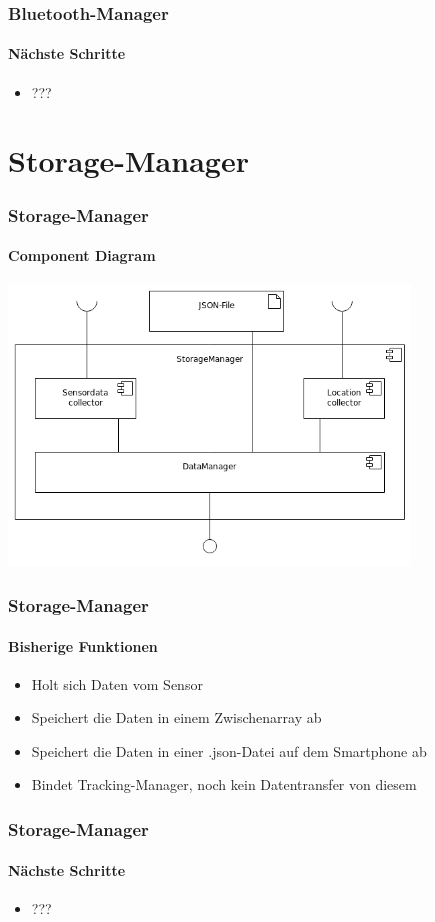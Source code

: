 \documentclass{beamer}
\begin{document}
\begin{frame}
\frametitle{Bluetooth-Manager}
\framesubtitle{N\"achste Schritte}
\begin{itemize}
  \item ???
\end{itemize}
\end{frame}


\section{Storage-Manager}

\begin{frame}
\frametitle{Storage-Manager}
\framesubtitle{Component Diagram}
\hspace{1cm} \includegraphics[width=0.8\textwidth]{../doc/SDD/pics/StorageMgr_Composition.png}
\end{frame}

\begin{frame}
\frametitle{Storage-Manager}
\framesubtitle{Bisherige Funktionen}
\begin{itemize}
  \item Holt sich Daten vom Sensor
  \item Speichert die Daten in einem Zwischenarray ab
  \item Speichert die Daten in einer .json-Datei auf dem Smartphone ab
  \item Bindet Tracking-Manager, noch kein Datentransfer von diesem
\end{itemize}
\end{frame}

\begin{frame}
\frametitle{Storage-Manager}
\framesubtitle{N\"achste Schritte}
\begin{itemize}
  \item ???
\end{itemize}
\end{frame}
\end{document}
